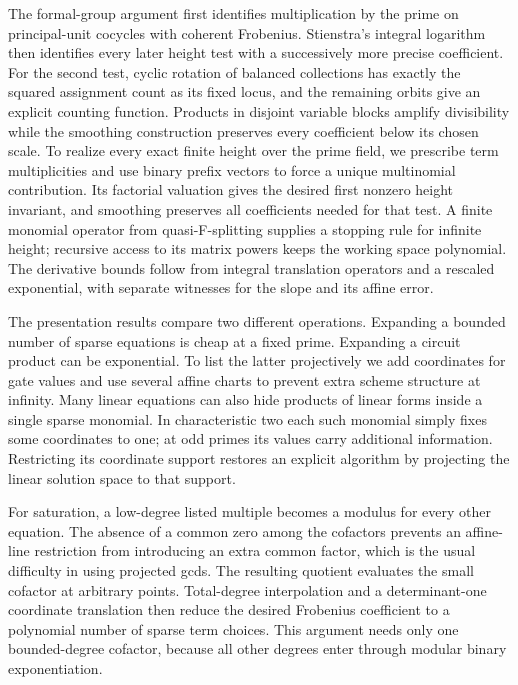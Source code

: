 The formal-group argument first identifies multiplication by the prime on principal-unit cocycles with coherent Frobenius. Stienstra's integral logarithm then identifies every later height test with a successively more precise coefficient. For the second test, cyclic rotation of balanced collections has exactly the squared assignment count as its fixed locus, and the remaining orbits give an explicit counting function. Products in disjoint variable blocks amplify divisibility while the smoothing construction preserves every coefficient below its chosen scale. To realize every exact finite height over the prime field, we prescribe term multiplicities and use binary prefix vectors to force a unique multinomial contribution. Its factorial valuation gives the desired first nonzero height invariant, and smoothing preserves all coefficients needed for that test. A finite monomial operator from quasi-F-splitting supplies a stopping rule for infinite height; recursive access to its matrix powers keeps the working space polynomial. The derivative bounds follow from integral translation operators and a rescaled exponential, with separate witnesses for the slope and its affine error.

The presentation results compare two different operations. Expanding a bounded number of sparse equations is cheap at a fixed prime. Expanding a circuit product can be exponential. To list the latter projectively we add coordinates for gate values and use several affine charts to prevent extra scheme structure at infinity. Many linear equations can also hide products of linear forms inside a single sparse monomial. In characteristic two each such monomial simply fixes some coordinates to one; at odd primes its values carry additional information. Restricting its coordinate support restores an explicit algorithm by projecting the linear solution space to that support.

For saturation, a low-degree listed multiple becomes a modulus for every other equation. The absence of a common zero among the cofactors prevents an affine-line restriction from introducing an extra common factor, which is the usual difficulty in using projected gcds. The resulting quotient evaluates the small cofactor at arbitrary points. Total-degree interpolation and a determinant-one coordinate translation then reduce the desired Frobenius coefficient to a polynomial number of sparse term choices. This argument needs only one bounded-degree cofactor, because all other degrees enter through modular binary exponentiation.

